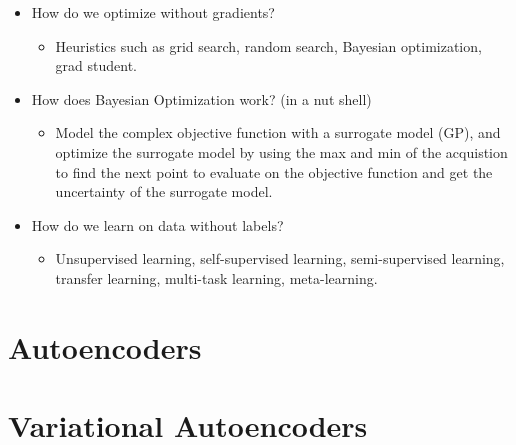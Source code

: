 \begin{summary}
    \begin{itemize}
        \item How do we optimize without gradients?
        \begin{itemize}
            \item Heuristics such as grid search, random search, Bayesian optimization, grad student.
        \end{itemize}
        \item How does Bayesian Optimization work? (in a nut shell)
        \begin{itemize}
            \item Model the complex objective function with a surrogate model (GP), and optimize the surrogate model by using the max and min of the acquistion to find the next point to evaluate on the objective function and get the uncertainty of the surrogate model.
        \end{itemize}
        \item How do we learn on data without labels?
        \begin{itemize}
            \item Unsupervised learning, self-supervised learning, semi-supervised learning, transfer learning, multi-task learning, meta-learning.
        \end{itemize}
    \end{itemize}
\end{summary}

\section{Autoencoders}

\section{Variational Autoencoders}